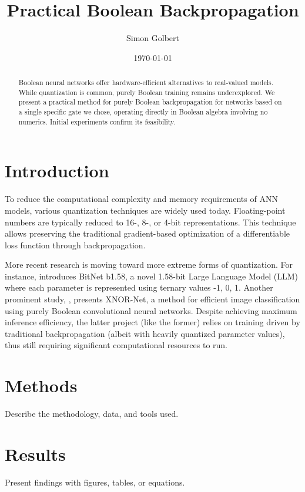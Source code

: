 \documentclass{article}
\title{Practical Boolean Backpropagation}
\author{Simon Golbert}
\date{\today}
\begin{document}
\maketitle

\begin{abstract}
    Boolean neural networks offer hardware-efficient alternatives to real-valued models. While quantization is common, purely Boolean training remains underexplored. We present a practical method for purely Boolean backpropagation for networks based on a single specific gate we chose, operating directly in Boolean algebra involving no numerics. Initial experiments confirm its feasibility.
\end{abstract}

\section{Introduction}
    To reduce the computational complexity and memory requirements of ANN models, various quantization techniques are widely used today. Floating-point numbers are typically reduced to 16-, 8-, or 4-bit representations. This technique allows preserving the traditional gradient-based optimization of a differentiable loss function through backpropagation.
    
    More recent research is moving toward more extreme forms of quantization. For instance, \cite{ma2024} introduces BitNet b1.58, a novel 1.58-bit Large Language Model (LLM) where each parameter is represented using ternary values {-1, 0, 1}. Another prominent study, \cite{rastegari2016}, presents XNOR-Net, a method for efficient image classification using purely Boolean convolutional neural networks. Despite achieving maximum inference efficiency, the latter project (like the former) relies on training driven by traditional backpropagation (albeit with heavily quantized parameter values), thus still requiring significant computational resources to run.

    

\section{Methods}
Describe the methodology, data, and tools used.

\section{Results}
Present findings with figures, tables, or equations.
\end{document}
